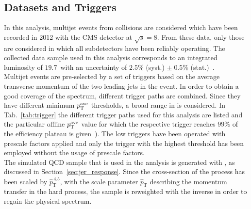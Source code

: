 \subsection{Datasets and Triggers}
\label{subsec:jer_samples_and_trigger}
\begin{table}[!tp]
\centering
\caption{Trigger paths with \ptave thresholds at which the trigger efficiency reaches the $99\%$ efficiency plateau. Thresholds are given for PFCHS jets.}
\label{tab:trigger}
\end{table}  
In this analysis, multijet events from \pp collisions are considered which have been recorded in 2012 with the CMS detector at $\sqrt{s}=8$\tev. From these data, only those are considered in which all subdetectors have been reliably operating. The collected data sample used in this analysis corresponds to an integrated luminosity of $19.7$~\fbinv with an uncertainty of $2.5\%$ (syst.)  $\pm \; 0.5\%$ (stat.)~\cite{CMS-PAS-LUM-13-001}. \\
Multijet events are pre-selected by a set of triggers based on the average transverse momentum of the two leading jets in the event. In order to obtain a good coverage of the \ptave spectrum, different trigger paths are combined. Since they have different minimum $p_{\text{T}}^\mathrm{ave}$ thresholds, a broad range in \ptave is considered. In Tab.~\ref{tab:trigger} the different trigger paths used for this analysis are listed and the particular offline $p_{\text{T}}^\mathrm{ave}$ value for which the respective trigger reaches $99\%$ of the efficiency plateau is given~\cite{DRathjens}). The low \ptave triggers have been operated with prescale factors applied and only the trigger with the highest \ptave threshold has been employed without the usage of prescale factors. \\
The simulated QCD sample that is used in the analysis is generated with \pythia, as discussed in Section~\ref{sec:jer_response}. Since the cross-section of the process has been scaled by $\hat{p}_\mathrm{T}^{\,4.5}$, with the scale parameter $\hat{p}_\mathrm{T}$ describing the momentum transfer in the hard process, the sample is reweighted with the inverse in order to regain the physical spectrum.  

